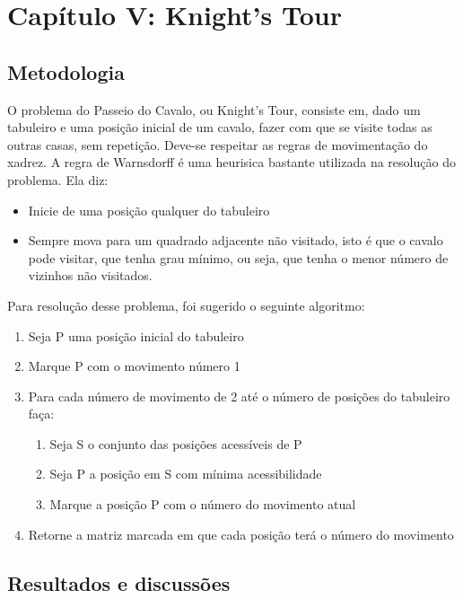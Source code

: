 \documentclass{article}
\begin{document}
\section{Capítulo V: Knight's Tour}
    \subsection{Metodologia}
    O problema do Passeio do Cavalo, ou Knight's Tour, consiste em, dado um tabuleiro e uma posição inicial de um cavalo, fazer com que se visite todas as outras casas, sem repetição. Deve-se respeitar as regras de movimentação do xadrez.
    A regra de Warnsdorff é uma heurisica bastante utilizada na resolução do problema. Ela diz:
        \begin{itemize}
            \item Inicie de uma posição qualquer do tabuleiro
            \item Sempre mova para um quadrado adjacente não visitado, isto é que o cavalo pode visitar, que tenha grau mínimo, ou seja, que tenha o menor número de vizinhos não visitados.
        \end{itemize}
    Para resolução desse problema, foi sugerido o seguinte algoritmo:
        \begin{enumerate}
            \item Seja P uma posição inicial do tabuleiro
            \item Marque P com o movimento número 1
            \item Para cada número de movimento de 2 até o número de posições do tabuleiro faça:
                \begin{enumerate}
                    \item Seja S o conjunto das posições acessíveis de P
                    \item Seja P a posição em S com mínima acessibilidade
                    \item Marque a posição P com o número do movimento atual
                \end{enumerate}
            \item Retorne a matriz marcada em que cada posição terá o número do movimento
        \end{enumerate}

    \subsection{Resultados e discussões}
\end{document}
